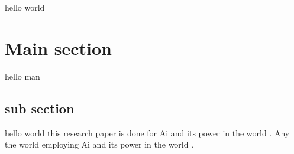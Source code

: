 hello world
\section{Main section}
hello man
\subsection{sub section}
hello world this research paper is done for Ai and its power in the world \citep{chaika_role_2023}. 
Any the world employing Ai and its power in the world \citep{neumann_we_2023}.